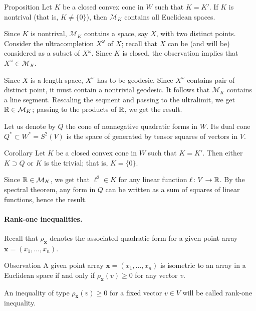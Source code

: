 \documentclass[a4paper,10pt]{article}
\begin{document}
\begin{thm}{Proposition}
Let $K$ be a closed convex cone in $W$ such that $K=K'$.
If $K$ is nontrival (that is, $K\ne \{0\}$), then $\mathcal{M}_K$ contains all Euclidean spaces.
\end{thm}

Since $K$ is nontrival, $\mathcal{M}_K$ contains a space, say $X$, with two distinct points.
Consider the ultracompletion $X^\omega$ of $X$;
recall that $X$ can be (and will be) considered as a subset of $X^\omega$.
Since $K$ is closed, the observation implies that $X^\omega\in \mathcal{M}_K$.

Since  $X$ is a length space, $X^\omega$ has to be geodesic.
Since $X^\omega$ contains pair of distinct point, it must contain a nontrivial geodesic.
It follows that $\mathcal{M}_K$ contains a line segment.
Rescaling the seqment and passing to the ultralimit, we get $\mathbb{R}\in \mathcal{M}_K$;
passing to the products of $\mathbb{R}$, we get the result. 
\qeds

Let us denote by $Q$ the cone of nonnegative quadratic forms in $W$.
Its dual cone $Q^*\subset W^*=S^2(V)$ is the space of generated by tensor squares of vectors in $V$. 

\begin{thm}{Corollary}
Let $K$ be a closed convex cone in $W$ such that $K=K'$.
Then either $K\supset Q$ or $K$ is the trivial; that is, $K=\{0\}$.
\end{thm}

Since $\mathbb{R}\in \mathcal{M}_K$, we get that $\ell^2\in K$ for any linear function $\ell\colon V\to\mathbb{R}$.
By the spectral theorem, any form in $Q$ can be written as a sum of squares of linear functions, hence the result.
\qeds

\paragraph{Rank-one inequalities.}\label{par:rank-one}
Recall that $\rho_{\bm{x}}$ denotes the associated quadratic form for a given point array $\bm{x}=(x_1,\dots,x_n)$.

\begin{thm}{Observation}
A given point array $\bm{x}=(x_1,\dots,x_n)$ is isometric to an array in a Euclidean space if and only if $\rho_{\bm{x}}(v)\ge 0$ for any vector $v$.
\end{thm}

An inequality of type $\rho_{\bm{x}}(v)\ge 0$ for a fixed vector $v\in V$ will be called rank-one inequality.
\end{document}
